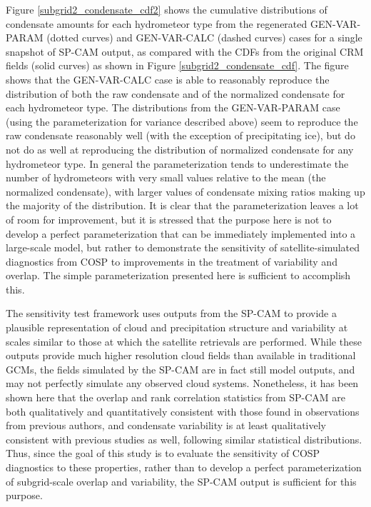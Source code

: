 Figure \ref{subgrid2_condensate_cdf2} shows the cumulative distributions of condensate amounts for each hydrometeor type from the regenerated GEN-VAR-PARAM (dotted curves) and GEN-VAR-CALC (dashed curves) cases for a single snapshot of SP-CAM output, as compared with the CDFs from the original CRM fields (solid curves) as shown in Figure \ref{subgrid2_condensate_cdf}. The figure shows that the GEN-VAR-CALC case is able to reasonably reproduce the distribution of both the raw condensate and of the normalized condensate for each hydrometeor type. The distributions from the GEN-VAR-PARAM case (using the parameterization for variance described above) seem to reproduce the raw condensate reasonably well (with the exception of precipitating ice), but do not do as well at reproducing the distribution of normalized condensate for any hydrometeor type. In general the parameterization tends to underestimate the number of hydrometeors with very small values relative to the mean (the normalized condensate), with larger values of condensate mixing ratios making up the majority of the distribution. It is clear that the parameterization leaves a lot of room for improvement, but it is stressed that the purpose here is not to develop a perfect parameterization that can be immediately implemented into a large-scale model, but rather to demonstrate the sensitivity of satellite-simulated diagnostics from COSP to improvements in the treatment of variability and overlap. The simple parameterization presented here is sufficient to accomplish this.

The sensitivity test framework uses outputs from the SP-CAM to provide a plausible representation of cloud and precipitation structure and variability at scales similar to those at which the satellite retrievals are performed. While these outputs provide much higher resolution cloud fields than available in traditional GCMs, the fields simulated by the SP-CAM are in fact still model outputs, and may not perfectly simulate any observed cloud systems. Nonetheless, it has been shown here that the overlap and rank correlation statistics from SP-CAM are both qualitatively and quantitatively consistent with those found in observations from previous authors, and condensate variability is at least qualitatively consistent with previous studies as well, following similar statistical distributions. Thus, since the goal of this study is to evaluate the sensitivity of COSP diagnostics to these properties, rather than to develop a perfect parameterization of subgrid-scale overlap and variability, the SP-CAM output is sufficient for this purpose. %


